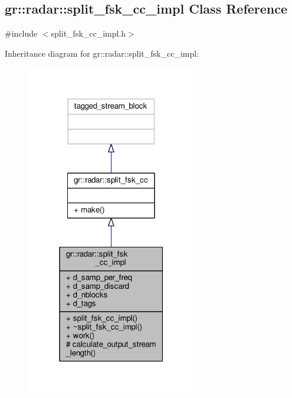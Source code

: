 \subsection{gr\+:\+:radar\+:\+:split\+\_\+fsk\+\_\+cc\+\_\+impl Class Reference}
\label{classgr_1_1radar_1_1split__fsk__cc__impl}


{\ttfamily \#include $<$split\+\_\+fsk\+\_\+cc\+\_\+impl.\+h$>$}



Inheritance diagram for gr\+:\+:radar\+:\+:split\+\_\+fsk\+\_\+cc\+\_\+impl\+:
\nopagebreak
\begin{figure}[H]
\begin{center}
\leavevmode
\includegraphics[width=211pt]{d6/dcb/classgr_1_1radar_1_1split__fsk__cc__impl__inherit__graph}
\end{center}
\end{figure}


